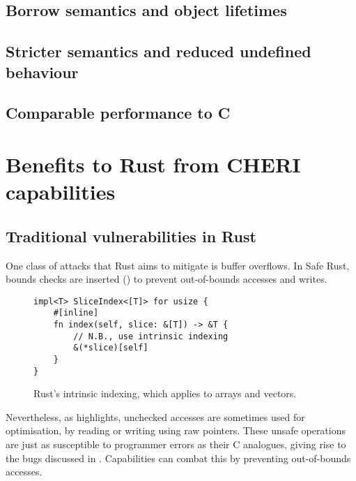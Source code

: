 \documentclass[dissertation.tex]{subfiles}
\begin{document}
\subsection{Borrow semantics and object lifetimes}


\subsection{Stricter semantics and reduced undefined behaviour}


\subsection{Comparable performance to C}


\section{Benefits to Rust from CHERI capabilities}
\label{sec:eval-rust}

\subsection{Traditional vulnerabilities in Rust}
\label{sec:eval-rust-vulns}

One class of attacks that Rust aims to mitigate is buffer overflows.
In Safe Rust, bounds checks are inserted ()
to prevent out-of-bounds accesses and writes.

\begin{figure}[ht]
\begin{lstlisting}
impl<T> SliceIndex<[T]> for usize {
    #[inline]
    fn index(self, slice: &[T]) -> &T {
        // N.B., use intrinsic indexing
        &(*slice)[self]
    }
}
\end{lstlisting}
\caption{ Rust's intrinsic indexing, which applies to
arrays and vectors.}
\label{lst:rust-index}
\end{figure}

Nevertheless, as  highlights, unchecked accesses
are sometimes used for optimisation, by reading or writing using raw
pointers.
These unsafe operations are just as susceptible to programmer errors as
their C analogues, giving rise to the bugs discussed in
.
Capabilities can combat this by preventing out-of-bounds accesses.
\end{document}
